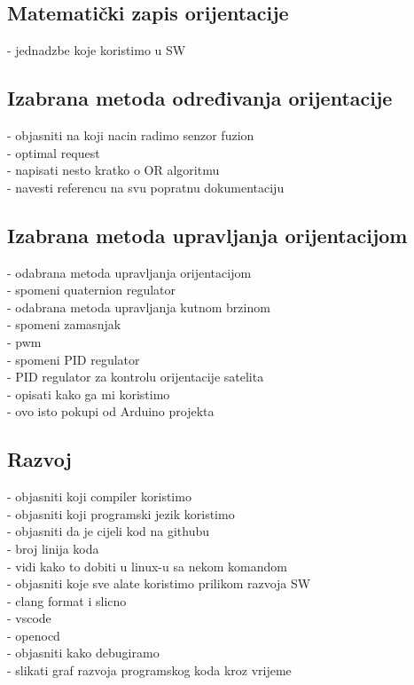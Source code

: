 \documentclass[times, utf8, diplomski, numeric]{templates/template}
\begin{document}
{{        \subsection{Matematički zapis orijentacije}{
            - jednadzbe koje koristimo u SW\\
        }
    
        \subsection{Izabrana metoda određivanja orijentacije}{
            - objasniti na koji nacin radimo senzor fuzion\\
                - optimal request\\
                    - napisati nesto kratko o OR algoritmu\\
                    - navesti referencu na svu popratnu dokumentaciju\\
        }
    
        \subsection{Izabrana metoda upravljanja orijentacijom}{
            - odabrana metoda upravljanja orijentacijom\\
                - spomeni quaternion regulator\\
            - odabrana metoda upravljanja kutnom brzinom\\
                - spomeni zamasnjak\\
                - pwm\\
                - spomeni PID regulator\\
                - PID regulator za kontrolu orijentacije satelita\\
                    - opisati kako ga mi koristimo\\
                    - ovo isto pokupi od Arduino projekta\\
        }

        \subsection{Razvoj}{
            - objasniti koji compiler koristimo\\
            - objasniti koji programski jezik koristimo\\
            - objasniti da je cijeli kod na githubu\\
            - broj linija koda\\
                - vidi kako to dobiti u linux-u sa nekom komandom\\
            - objasniti koje sve alate koristimo prilikom razvoja SW\\
                - clang format i slicno\\
                - vscode\\
                - openocd\\
            - objasniti kako debugiramo\\
            - slikati graf razvoja programskog koda kroz vrijeme\\
        }
    }
}
\end{document}
